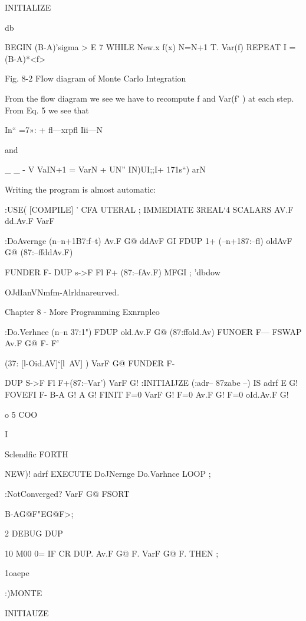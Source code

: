  

INITIALIZE

db

BEGIN
(B-A)'sigma > E 7
WHILE
New.x f(x)
N=N+1
T. Var(f)
REPEAT
I = (B-A)*<f>

 

 

 

 

 

Fig. 8-2 FIow diagram of Monte Carlo Integration

From the ﬂow diagram we see we have to recompute f and
Var(f' ) at each step. From Eq. 5 we see that

In“ =7»: + ﬂ—xrpﬂ Iii—N

and

_ _ - V
VaIN+1 = VarN + UN” IN)UI;;I+ 171s“) arN

Writing the program is almost automatic:

:USE( [COMPILE] ' CFA UTERAL ; IMMEDIATE
3REAL‘4 SCALARS AV.F dd.Av.F VarF

:DoAvernge (n--n+1B7:f--t)
Av.F G@ ddAvF GI \seveoldAv
FDUP 1+ (--n+187:--fl)
oldAvF G@ (87:--ffddAv.F)

FUNDER F-
DUP s->F Fl F+ (87:--fAv.F)
MFGI ; \pusway \corl'dbdow

OJdIanVNmfm-Alrldnareurved.

Chapter 8 - More Programming Exnrnpleo

:Do.Verhnce (n--n 37:1")
FDUP old.Av.F G@ (87:ffold.Av)
FUNOER F— FSWAP
Av.F G@ F- F'

(37: [l-Oid.AV]‘[l~AV] )
VarF G@ FUNDER F-

DUP S->F Fl F+(87:--Var’)
VarF G!
:INITIAIJZE (:adr-- 87zabe --)
IS adrf
E G!
FOVEFI F- B-A G! A G!
FINIT
F=0 VarF G!
F=0 Av.F G!
F=0 oId.Av.F G!

o 5 COO \exerclseStImes

 

I

Sclendﬁc FORTH

NEW)! adrf EXECUTE
DoJNernge Do.Varhnce
LOOP ;

:NotConverged? VarF G@ FSORT

B-AG@F"EG@F>;

2 DEBUG DUP

10 M00
0= IF CR DUP.
Av.F G@ F.
VarF G@ F. THEN ;

\every1oaepe

:)MONTE

INITIAUZE

